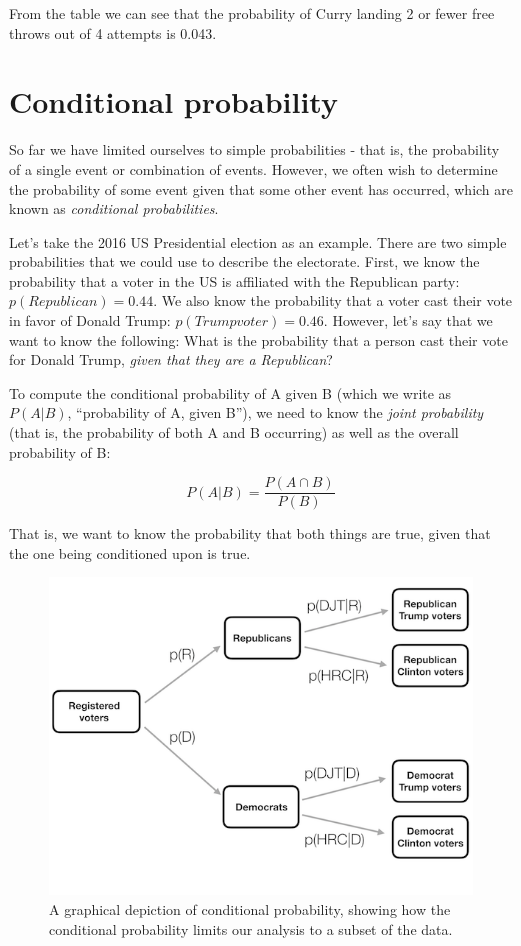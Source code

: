 \documentclass[12pt,]{book}
\theoremstyle{definition}
\theoremstyle{definition}
\theoremstyle{definition}
\theoremstyle{remark}
\begin{document}
From the table we can see that the probability of Curry landing 2 or fewer free throws out of 4 attempts is 0.043.

\hypertarget{conditional-probability}{%
\section{Conditional probability}\label{conditional-probability}}

So far we have limited ourselves to simple probabilities - that is, the probability of a single event or combination of events. However, we often wish to determine the probability of some event given that some other event has occurred, which are known as \emph{conditional probabilities}.

Let's take the 2016 US Presidential election as an example. There are two simple probabilities that we could use to describe the electorate. First, we know the probability that a voter in the US is affiliated with the Republican party: \(p(Republican) = 0.44\). We also know the probability that a voter cast their vote in favor of Donald Trump: \(p(Trump voter)=0.46\). However, let's say that we want to know the following: What is the probability that a person cast their vote for Donald Trump, \emph{given that they are a Republican}?

To compute the conditional probability of A given B (which we write as \(P(A|B)\), ``probability of A, given B''), we need to know the \emph{joint probability} (that is, the probability of both A and B occurring) as well as the overall probability of B:

\[
P(A|B) = \frac{P(A \cap B)}{P(B)}
\]

That is, we want to know the probability that both things are true, given that the one being conditioned upon is true.

\begin{figure}
\includegraphics[width=8in,height=0.5\textheight]{images/conditional_probability} \caption{A graphical depiction of conditional probability, showing how the conditional probability limits our analysis to a subset of the data.}\label{fig:conditionalProbability}
\end{figure}
\end{document}
